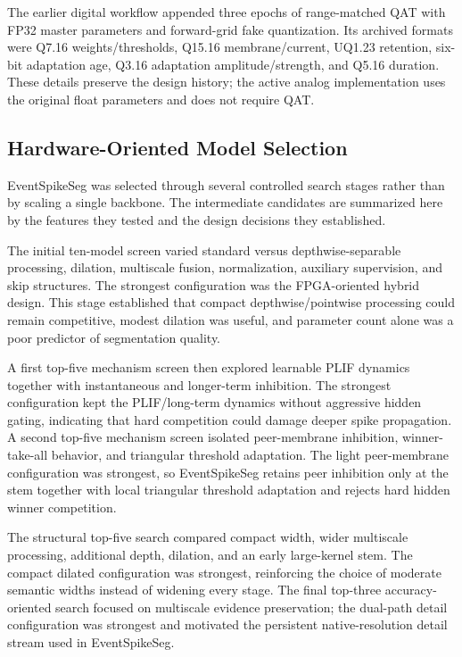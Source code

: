 \documentclass[preprint,12pt,number]{elsarticle}
\begin{document}
The earlier digital workflow appended three epochs of range-matched QAT with FP32 master parameters and forward-grid fake quantization. Its archived formats were Q7.16 weights/thresholds, Q15.16 membrane/current, UQ1.23 retention, six-bit adaptation age, Q3.16 adaptation amplitude/strength, and Q5.16 duration. These details preserve the design history; the active analog implementation uses the original float parameters and does not require QAT.

\subsection{Hardware-Oriented Model Selection}
\label{sec:evolution}

EventSpikeSeg was selected through several controlled search stages rather than by scaling a single backbone. The intermediate candidates are summarized here by the features they tested and the design decisions they established.

The initial ten-model screen varied standard versus depthwise-separable processing, dilation, multiscale fusion, normalization, auxiliary supervision, and skip structures. The strongest configuration was the FPGA-oriented hybrid design. This stage established that compact depthwise/pointwise processing could remain competitive, modest dilation was useful, and parameter count alone was a poor predictor of segmentation quality.

A first top-five mechanism screen then explored learnable PLIF dynamics together with instantaneous and longer-term inhibition. The strongest configuration kept the PLIF/long-term dynamics without aggressive hidden gating, indicating that hard competition could damage deeper spike propagation. A second top-five mechanism screen isolated peer-membrane inhibition, winner-take-all behavior, and triangular threshold adaptation. The light peer-membrane configuration was strongest, so EventSpikeSeg retains peer inhibition only at the stem together with local triangular threshold adaptation and rejects hard hidden winner competition.

The structural top-five search compared compact width, wider multiscale processing, additional depth, dilation, and an early large-kernel stem. The compact dilated configuration was strongest, reinforcing the choice of moderate semantic widths instead of widening every stage. The final top-three accuracy-oriented search focused on multiscale evidence preservation; the dual-path detail configuration was strongest and motivated the persistent native-resolution detail stream used in EventSpikeSeg.
\end{document}
